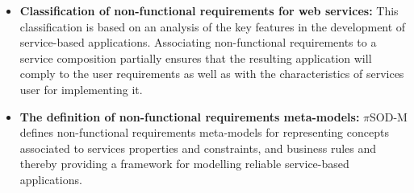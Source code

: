 \begin{itemize}
  \item  \textbf{Classification of non-functional requirements for web services:}
  This classification is based on an analysis of
  the key features in the development of service-based applications. Associating
  non-functional requirements to a service composition partially ensures that
  the resulting application will comply to the user requirements as well as
  with the characteristics of services user for implementing it.
  
  \item \textbf{The definition of non-functional requirements meta-models:}
  $\pi$SOD-M defines non-functional requirements meta-models for representing concepts
  associated to services properties and constraints, and business rules and thereby providing a framework for modelling reliable
  service-based applications.
  

\end{itemize}
